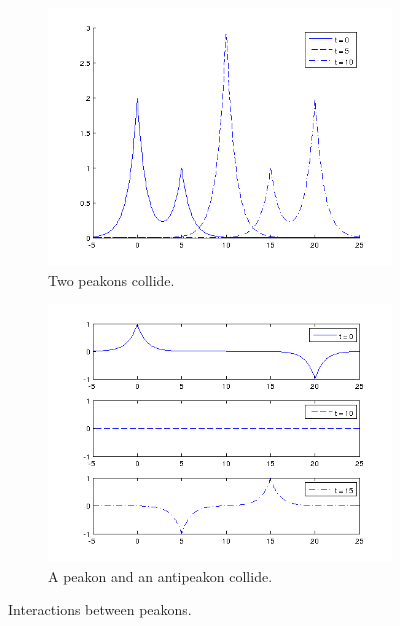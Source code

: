 \begin{figure}[h!]
\begin{subfigure}[b]{0.49\textwidth}
                \includegraphics[width=\textwidth]{gfx/peakonovertake}
                \caption{Two peakons collide.}
                \label{fig:peakonovertake}
        \end{subfigure}
        \begin{subfigure}[b]{0.49\textwidth}
                \includegraphics[width=\textwidth]{gfx/peakonantipeakon}
                \caption{A peakon and an antipeakon collide.}
                \label{fig:peakonantipeakon}
        \end{subfigure}
        \caption{Interactions between peakons.}
\end{figure}
